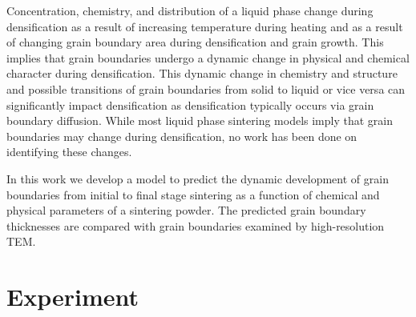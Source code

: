 Concentration, chemistry, and distribution of a liquid phase change during densification as a result of increasing temperature during heating and as a result of changing grain boundary area during densification and grain growth. This implies that grain boundaries undergo a dynamic change in physical and chemical character during densification. This dynamic change in chemistry and structure and possible transitions of grain boundaries from solid to liquid or vice versa can significantly impact densification as densification typically occurs via grain boundary diffusion. While most liquid phase sintering models imply that grain boundaries may change during densification, no work has been done on identifying these changes.

In this work we develop a model to predict the dynamic development of grain boundaries from initial to final stage sintering as a function of chemical and physical parameters of a sintering powder. The predicted grain boundary thicknesses are compared with grain boundaries examined by high-resolution TEM. 

\section{Experiment}

